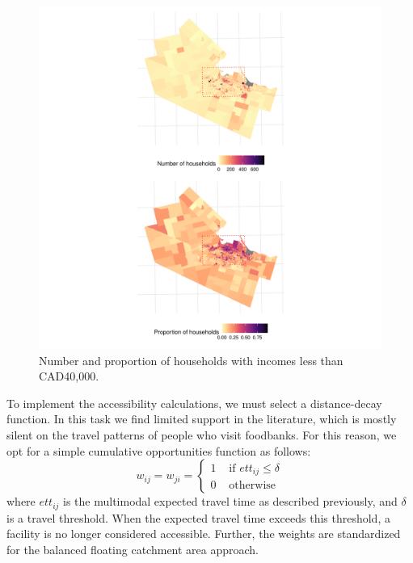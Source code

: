 \documentclass[]{elsarticle} %
\begin{document}
\begin{figure}
\includegraphics[width=1\linewidth]{Accessibility-Foodbanks-Hamilton_files/figure-latex/plot-low-income-households-1} \caption{\label{fig:low-income-households}Number and proportion of households with incomes less than CAD40,000.}\label{fig:plot-low-income-households}
\end{figure}

To implement the accessibility calculations, we must select a
distance-decay function. In this task we find limited support in the
literature, which is mostly silent on the travel patterns of people who
visit foodbanks. For this reason, we opt for a simple cumulative
opportunities function as follows: \[
w_{ij}=w_{ji}=
\begin{cases}
1 & \text{ if } ett_{ij}\le \delta\\
0 & \text{ otherwise}
\end{cases}
\] \noindent where \(ett_{ij}\) is the multimodal expected travel time
as described previously, and \(\delta\) is a travel threshold. When the
expected travel time exceeds this threshold, a facility is no longer
considered accessible. Further, the weights are standardized for the
balanced floating catchment area approach.
\end{document}
